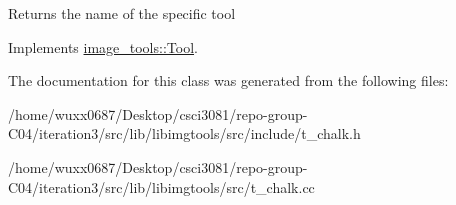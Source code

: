 \begin{DoxyReturn}{Returns}
the name of the specific tool 
\end{DoxyReturn}


Implements \hyperlink{classimage__tools_1_1Tool_a251c179e3ac9756d08fbcd082750f8a9}{image\+\_\+tools\+::\+Tool}.



The documentation for this class was generated from the following files\+:\begin{DoxyCompactItemize}
\item 
/home/wuxx0687/\+Desktop/csci3081/repo-\/group-\/\+C04/iteration3/src/lib/libimgtools/src/include/t\+\_\+chalk.\+h\item 
/home/wuxx0687/\+Desktop/csci3081/repo-\/group-\/\+C04/iteration3/src/lib/libimgtools/src/t\+\_\+chalk.\+cc\end{DoxyCompactItemize}
